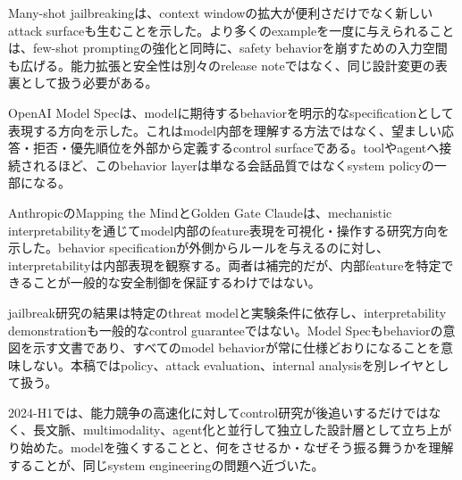 
Many-shot jailbreakingは、context windowの拡大が便利さだけでなく新しいattack surfaceも生むことを示した。より多くのexampleを一度に与えられることは、few-shot promptingの強化と同時に、safety behaviorを崩すための入力空間も広げる。能力拡張と安全性は別々のrelease noteではなく、同じ設計変更の表裏として扱う必要がある。\autocite{src-018fb3abd44d,src-28ee6f0f00f4,src-e91e6f80eaac}


OpenAI Model Specは、modelに期待するbehaviorを明示的なspecificationとして表現する方向を示した。これはmodel内部を理解する方法ではなく、望ましい応答・拒否・優先順位を外部から定義するcontrol surfaceである。toolやagentへ接続されるほど、このbehavior layerは単なる会話品質ではなくsystem policyの一部になる。\autocite{src-d1406200c99e}


AnthropicのMapping the MindとGolden Gate Claudeは、mechanistic interpretabilityを通じてmodel内部のfeature表現を可視化・操作する研究方向を示した。behavior specificationが外側からルールを与えるのに対し、interpretabilityは内部表現を観察する。両者は補完的だが、内部featureを特定できることが一般的な安全制御を保証するわけではない。\autocite{src-4ff5ab7d45bc}


\begin{claimboundary}
jailbreak研究の結果は特定のthreat modelと実験条件に依存し、interpretability demonstrationも一般的なcontrol guaranteeではない。Model Specもbehaviorの意図を示す文書であり、すべてのmodel behaviorが常に仕様どおりになることを意味しない。本稿ではpolicy、attack evaluation、internal analysisを別レイヤとして扱う。\autocite{src-018fb3abd44d,src-4ff5ab7d45bc,src-5019b9256d83,src-d1406200c99e}
\end{claimboundary}

2024-H1では、能力競争の高速化に対してcontrol研究が後追いするだけではなく、長文脈、multimodality、agent化と並行して独立した設計層として立ち上がり始めた。modelを強くすることと、何をさせるか・なぜそう振る舞うかを理解することが、同じsystem engineeringの問題へ近づいた。\autocite{src-018fb3abd44d,src-28ee6f0f00f4,src-4ff5ab7d45bc,src-d1406200c99e,src-e91e6f80eaac}
